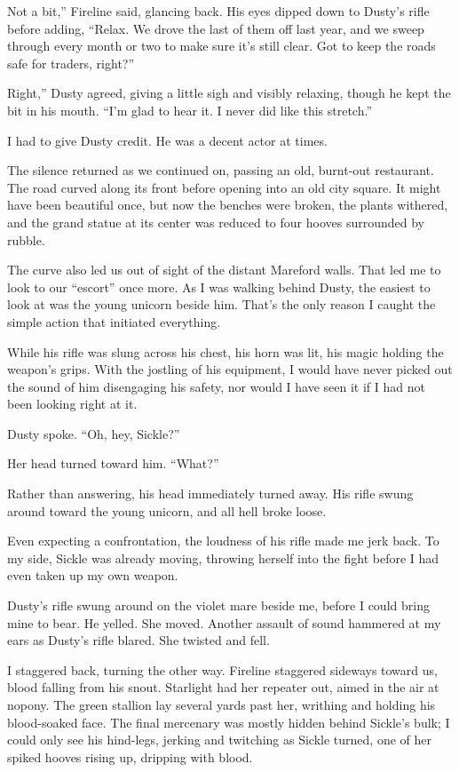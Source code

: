 \leavevmode{}Not a bit,” Fireline said, glancing back. His eyes dipped down to Dusty’s rifle before adding, “Relax. We drove the last of them off last year, and we sweep through every month or two to make sure it’s still clear. Got to keep the roads safe for traders, right?”

\leavevmode{}Right,” Dusty agreed, giving a little sigh and visibly relaxing, though he kept the bit in his mouth. “I’m glad to hear it. I never did like this stretch.”

I had to give Dusty credit. He was a decent actor at times.

The silence returned as we continued on, passing an old, burnt-out restaurant. The road curved along its front before opening into an old city square. It might have been beautiful once, but now the benches were broken, the plants withered, and the grand statue at its center was reduced to four hooves surrounded by rubble.

The curve also led us out of sight of the distant Mareford walls. That led me to look to our “escort” once more. As I was walking behind Dusty, the easiest to look at was the young unicorn beside him. That’s the only reason I caught the simple action that initiated everything.

While his rifle was slung across his chest, his horn was lit, his magic holding the weapon’s grips. With the jostling of his equipment, I would have never picked out the sound of him disengaging his safety, nor would I have seen it if I had not been looking right at it.

Dusty spoke. “Oh, hey, Sickle?”

Her head turned toward him. “What?”

Rather than answering, his head immediately turned away. His rifle swung around toward the young unicorn, and all hell broke loose.

Even expecting a confrontation, the loudness of his rifle made me jerk back. To my side, Sickle was already moving, throwing herself into the fight before I had even taken up my own weapon.

Dusty’s rifle swung around on the violet mare beside me, before I could bring mine to bear. He yelled. She moved. Another assault of sound hammered at my ears as Dusty’s rifle blared. She twisted and fell.

I staggered back, turning the other way. Fireline staggered sideways toward us, blood falling from his snout. Starlight had her repeater out, aimed in the air at nopony. The green stallion lay several yards past her, writhing and holding his blood-soaked face. The final mercenary was mostly hidden behind Sickle’s bulk; I could only see his hind-legs, jerking and twitching as Sickle turned, one of her spiked hooves rising up, dripping with blood.

